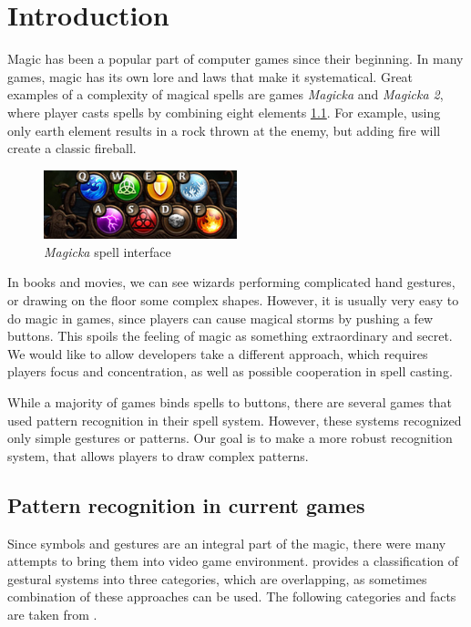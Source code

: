 
\chapter{Introduction}
\label{chap:gf}

Magic has been a popular part of computer games since their beginning. In many games, magic has its own lore and laws that make it systematical. Great examples of a complexity of magical spells are games \emph{Magicka} and \emph{Magicka 2}, where player casts spells by combining eight elements \ref{fig:magicka}. For example, using only earth element results in a rock thrown at the enemy, but adding fire will create a classic fireball.
\begin{figure}[!htb]
  \centering
  \includegraphics[width=0.5\textwidth]{ext/magicka.png}
  \caption{\emph{Magicka} spell interface}
  \label{fig:magicka}
\end{figure}

In books and movies, we can see wizards performing complicated hand gestures, or drawing on the floor some complex shapes. However, it is usually very easy to do magic in games, since players can cause magical storms by pushing a few buttons. This spoils the feeling of magic as something extraordinary and secret. We would like to allow developers take a different approach, which requires players focus and concentration, as well as possible cooperation in spell casting.

While a majority of games binds spells to buttons, there are several games that used pattern recognition in their spell system. However, these systems recognized only simple gestures or patterns. Our goal is to make a more robust recognition system, that allows players to draw complex patterns.

\section{Pattern recognition in current games}

Since symbols and gestures are an integral part of the magic, there were many attempts to bring them into video game environment. \citet{gameMagic} provides a classification of gestural systems into three categories, which are overlapping, as sometimes combination of these approaches can be used. The following categories and facts are taken from \citet{gameMagic}.

